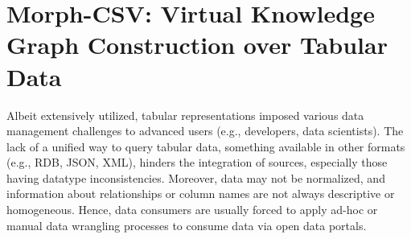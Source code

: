 \section{Morph-CSV: Virtual Knowledge Graph Construction over Tabular Data}
\label{chap6_morphgcsv}

Albeit extensively utilized, tabular representations imposed various data management challenges to advanced users (e.g., developers, data scientists). The lack of a unified way to query tabular data, something available in other formats (e.g., RDB, JSON, XML), hinders the integration of sources, especially those having datatype inconsistencies. Moreover, data may not be normalized, and information about relationships or column names are not always descriptive or homogeneous. Hence, data consumers are usually forced to apply ad-hoc or manual data wrangling processes to consume data via open data portals. 


